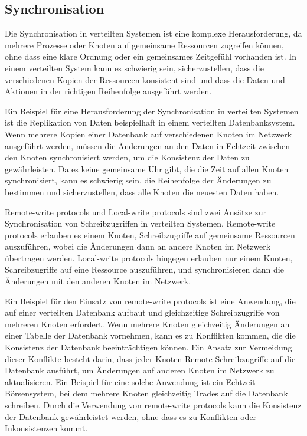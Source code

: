 \subsection{Synchronisation}

Die Synchronisation in verteilten Systemen ist eine komplexe Herausforderung, da mehrere Prozesse oder Knoten auf gemeinsame Ressourcen zugreifen können, ohne dass eine klare Ordnung oder ein gemeinsames Zeitgefühl vorhanden ist. In einem verteilten System kann es schwierig sein, sicherzustellen, dass die verschiedenen Kopien der Ressourcen konsistent sind und dass die Daten und Aktionen in der richtigen Reihenfolge ausgeführt werden.

Ein Beispiel für eine Herausforderung der Synchronisation in verteilten Systemen ist die Replikation von Daten beispielhaft in einem verteilten Datenbanksystem. Wenn mehrere Kopien einer Datenbank auf verschiedenen Knoten im Netzwerk ausgeführt werden, müssen die Änderungen an den Daten in Echtzeit zwischen den Knoten synchronisiert werden, um die Konsistenz der Daten zu gewährleisten. Da es keine gemeinsame Uhr gibt, die die Zeit auf allen Knoten synchronisiert, kann es schwierig sein, die Reihenfolge der Änderungen zu bestimmen und sicherzustellen, dass alle Knoten die neuesten Daten haben.

Remote-write protocols und Local-write protocols sind zwei Ansätze zur Synchronisation von Schreibzugriffen in verteilten Systemen. Remote-write protocols erlauben es einem Knoten, Schreibzugriffe auf gemeinsame Ressourcen auszuführen, wobei die Änderungen dann an andere Knoten im Netzwerk übertragen werden. Local-write protocols hingegen erlauben nur einem Knoten, Schreibzugriffe auf eine Ressource auszuführen, und synchronisieren dann die Änderungen mit den anderen Knoten im Netzwerk.

Ein Beispiel für den Einsatz von remote-write protocols ist eine Anwendung, die auf einer verteilten Datenbank aufbaut und gleichzeitige Schreibzugriffe von mehreren Knoten erfordert. Wenn mehrere Knoten gleichzeitig Änderungen an einer Tabelle der Datenbank vornehmen, kann es zu Konflikten kommen, die die Konsistenz der Datenbank beeinträchtigen können. Ein Ansatz zur Vermeidung dieser Konflikte besteht darin, dass jeder Knoten Remote-Schreibzugriffe auf die Datenbank ausführt, um Änderungen auf anderen Knoten im Netzwerk zu aktualisieren. Ein Beispiel für eine solche Anwendung ist ein Echtzeit-Börsensystem, bei dem mehrere Knoten gleichzeitig Trades auf die Datenbank schreiben. Durch die Verwendung von remote-write protocols kann die Konsistenz der Datenbank gewährleistet werden, ohne dass es zu Konflikten oder Inkonsistenzen kommt.

